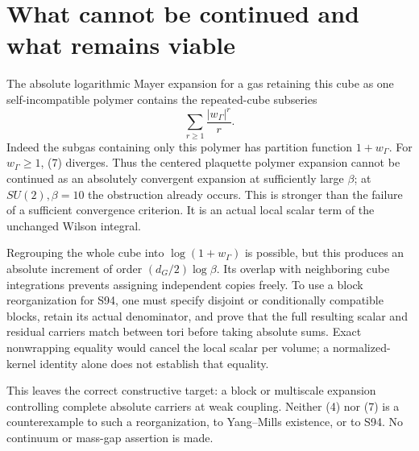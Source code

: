 \documentclass{article}
\begin{document}
\section{What cannot be continued and what remains viable}
The absolute logarithmic Mayer expansion for a gas retaining this cube as one self-incompatible polymer contains the repeated-cube subseries
\[
 \sum_{r\geq1}\frac{|w_\Gamma|^r}{r}.
 \tag{7}
\]
Indeed the subgas containing only this polymer has partition function $1+w_\Gamma$. For $w_\Gamma\geq1$, (7) diverges. Thus the centered plaquette polymer expansion cannot be continued as an absolutely convergent expansion at sufficiently large $\beta$; at $SU(2),\beta=10$ the obstruction already occurs. This is stronger than the failure of a sufficient convergence criterion. It is an actual local scalar term of the unchanged Wilson integral.

Regrouping the whole cube into $\log(1+w_\Gamma)$ is possible, but this produces an absolute increment of order $(d_G/2)\log\beta$. Its overlap with neighboring cube integrations prevents assigning independent copies freely. To use a block reorganization for S94, one must specify disjoint or conditionally compatible blocks, retain its actual denominator, and prove that the full resulting scalar and residual carriers match between tori before taking absolute sums. Exact nonwrapping equality would cancel the local scalar per volume; a normalized-kernel identity alone does not establish that equality.

This leaves the correct constructive target: a block or multiscale expansion controlling complete absolute carriers at weak coupling. Neither (4) nor (7) is a counterexample to such a reorganization, to Yang--Mills existence, or to S94. No continuum or mass-gap assertion is made.
\end{document}
